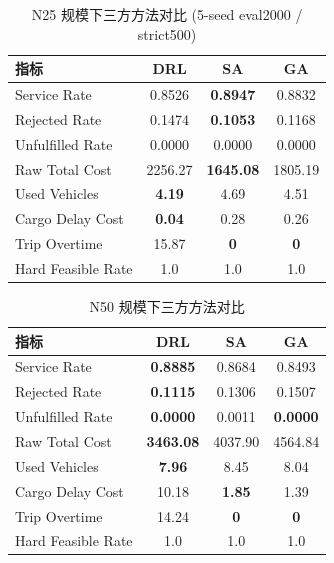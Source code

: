 
\begin{table}[htbp]
\centering
\caption{N25 规模下三方方法对比 (5-seed eval2000 / strict500)}
\label{tab:comparison-n25}
\begin{tabular}{lccc}
\toprule
指标 & DRL & SA & GA \\
\midrule
Service Rate        & 0.8526          & \textbf{0.8947} & 0.8832          \\
Rejected Rate       & 0.1474          & \textbf{0.1053} & 0.1168          \\
Unfulfilled Rate    & 0.0000          & 0.0000          & 0.0000          \\
Raw Total Cost      & 2256.27         & \textbf{1645.08}& 1805.19         \\
Used Vehicles       & \textbf{4.19}   & 4.69            & 4.51            \\
Cargo Delay Cost    & \textbf{0.04}   & 0.28            & 0.26            \\
Trip Overtime       & 15.87           & \textbf{0}      & \textbf{0}      \\
Hard Feasible Rate  & 1.0             & 1.0             & 1.0             \\
\bottomrule
\end{tabular}
\end{table}

\begin{table}[htbp]
\centering
\caption{N50 规模下三方方法对比}
\label{tab:comparison-n50}
\begin{tabular}{lccc}
\toprule
指标 & DRL & SA & GA \\
\midrule
Service Rate        & \textbf{0.8885} & 0.8684          & 0.8493          \\
Rejected Rate       & \textbf{0.1115} & 0.1306          & 0.1507          \\
Unfulfilled Rate    & \textbf{0.0000} & 0.0011          & \textbf{0.0000} \\
Raw Total Cost      & \textbf{3463.08}& 4037.90         & 4564.84         \\
Used Vehicles       & \textbf{7.96}   & 8.45            & 8.04            \\
Cargo Delay Cost    & 10.18           & \textbf{1.85}   & 1.39            \\
Trip Overtime       & 14.24           & \textbf{0}      & \textbf{0}      \\
Hard Feasible Rate  & 1.0             & 1.0             & 1.0             \\
\bottomrule
\end{tabular}
\end{table}

